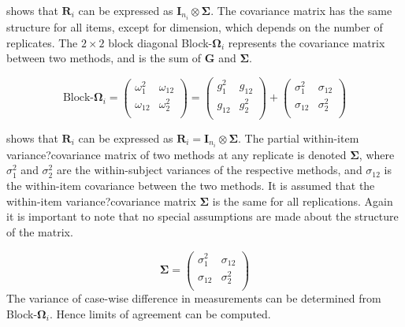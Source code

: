 \documentclass[12pt, a4paper]{report}
\theoremstyle{plain}
\theoremstyle{definition}
\theoremstyle{remark}
\begin{document}
\citet{hamlett} shows that $\boldsymbol{R}_{i}$  can be expressed as $\boldsymbol{I}_{n_{i}} \otimes \boldsymbol{\Sigma}$. The covariance matrix has the same structure for all items, except for dimension, which depends on the number of replicates. The $2 \times 2$ block diagonal Block-$\boldsymbol{\Omega}_{i}$ represents the covariance matrix between two methods, and is the sum of $\boldsymbol{G}$ and $\boldsymbol{\Sigma}$.

\[ \textrm{Block-}\boldsymbol{\Omega}_{i}  = \left(\begin{array}{cc}
\omega^2_1  & \omega_{12} \\
\omega_{12} & \omega^2_2 \\
\end{array}  \right)
=  \left(
\begin{array}{cc}
g^2_1  & g_{12} \\
g_{12} & g^2_2 \\
\end{array} \right)+
\left(
\begin{array}{cc}
\sigma^2_1  & \sigma_{12} \\
\sigma_{12} & \sigma^2_2 \\
\end{array}\right)
\]



\citet{hamlett} shows that $\boldsymbol{R}_{i}$  can be expressed as $\boldsymbol{R}_{i} = \boldsymbol{I}_{n_{i}} \otimes \boldsymbol{\Sigma}$. The partial within-item variance?covariance matrix of two methods at any replicate is denoted $\boldsymbol{\Sigma}$, where $\sigma^2_{1}$ and $\sigma^2_{2}$ are the within-subject variances of the respective methods, and $\sigma_{12}$ is the within-item covariance between the two methods. It is assumed that the within-item variance?covariance matrix $\boldsymbol{\Sigma}$ is the same for all replications. Again it is important to note that no special assumptions are made about the structure of the matrix.

\begin{equation}
\boldsymbol{\Sigma} = \left( \begin{array}{cc}
\sigma^2_{1} & \sigma_{12} \\
\sigma_{12} & \sigma^2_{2} \\
\end{array}\right)
\end{equation}
The variance of case-wise difference in measurements can be determined from Block-$\boldsymbol{\Omega}_{i}$. Hence limits of agreement can be computed.
\end{document}
